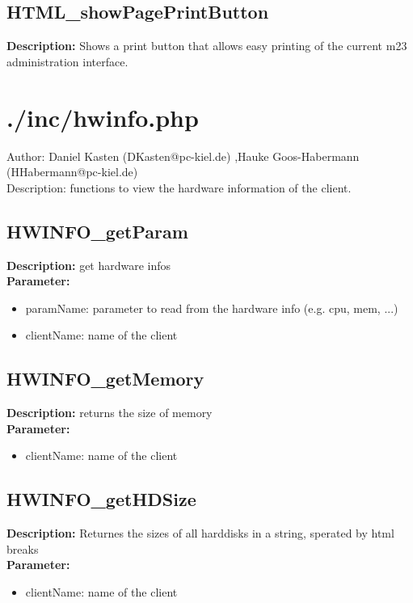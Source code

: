 \subsection{HTML\_showPagePrintButton}
\textbf{Description:} Shows a print button that allows easy printing of the current m23 administration interface.\\

\newpage\section{./inc/hwinfo.php}
 Author: Daniel Kasten (DKasten@pc-kiel.de) ,Hauke Goos-Habermann (HHabermann@pc-kiel.de)\\
 Description: functions to view the hardware information of the client.\\

\subsection{HWINFO\_getParam}
\textbf{Description:} get hardware infos\\
\textbf{Parameter:}
\begin{itemize}
\item paramName: parameter to read from the hardware info (e.g. cpu, mem, ...)
\item clientName: name of the client
\end{itemize}

\subsection{HWINFO\_getMemory}
\textbf{Description:} returns the size of memory\\
\textbf{Parameter:}
\begin{itemize}
\item clientName: name of the client
\end{itemize}

\subsection{HWINFO\_getHDSize}
\textbf{Description:} Returnes the sizes of all harddisks in a string, sperated by html breaks\\
\textbf{Parameter:}
\begin{itemize}
\item clientName: name of the client
\end{itemize}

